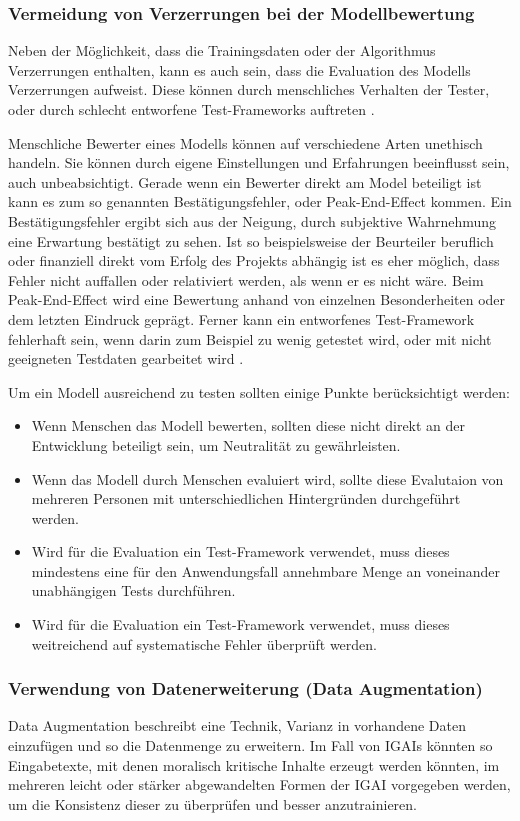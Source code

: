 \documentclass[12pt]{article}
\begin{document}
\subsubsection{Vermeidung von Verzerrungen bei der Modellbewertung}
Neben der Möglichkeit, dass die Trainingsdaten oder der Algorithmus Verzerrungen enthalten, kann es auch sein, dass die Evaluation des Modells Verzerrungen aufweist.
Diese können durch menschliches Verhalten der Tester, oder durch schlecht entworfene Test-Frameworks auftreten \cite[S. 54f.]{Srinivasan}.

Menschliche Bewerter eines Modells können auf verschiedene Arten unethisch handeln. Sie können durch eigene Einstellungen und Erfahrungen beeinflusst sein, auch unbeabsichtigt.
Gerade wenn ein Bewerter direkt am Model beteiligt ist kann es zum so genannten Bestätigungsfehler, oder \glqq Peak-End-Effect\grqq{} kommen. Ein Bestätigungsfehler ergibt sich aus der Neigung, durch subjektive Wahrnehmung eine Erwartung bestätigt zu sehen. Ist so beispielsweise der Beurteiler beruflich oder finanziell direkt vom Erfolg des Projekts abhängig ist es eher möglich, dass Fehler nicht auffallen oder relativiert werden, als wenn er es nicht wäre.
Beim \glqq Peak-End-Effect\grqq{} wird eine Bewertung anhand von einzelnen Besonderheiten oder dem letzten Eindruck geprägt.
Ferner kann ein entworfenes Test-Framework fehlerhaft sein, wenn darin zum Beispiel zu wenig getestet wird, oder mit nicht geeigneten Testdaten gearbeitet wird \cite[S. 54f.]{Srinivasan}.

Um ein Modell ausreichend zu testen sollten einige Punkte berücksichtigt werden:
\begin{itemize}
    \item Wenn Menschen das Modell bewerten, sollten diese nicht direkt an der Entwicklung beteiligt sein, um Neutralität zu gewährleisten.
    \item Wenn das Modell durch Menschen evaluiert wird, sollte diese Evalutaion von mehreren Personen mit unterschiedlichen Hintergründen durchgeführt werden.
    \item Wird für die Evaluation ein Test-Framework verwendet, muss dieses mindestens eine für den Anwendungsfall annehmbare Menge an voneinander unabhängigen Tests durchführen.
    \item Wird für die Evaluation ein Test-Framework verwendet, muss dieses weitreichend auf systematische Fehler überprüft werden.
\end{itemize}


\subsubsection{Verwendung von Datenerweiterung (Data Augmentation)}
Data Augmentation beschreibt eine Technik, Varianz in vorhandene Daten einzufügen und so die Datenmenge zu erweitern.
Im Fall von IGAIs könnten so Eingabetexte, mit denen moralisch kritische Inhalte erzeugt werden könnten, im mehreren leicht oder stärker abgewandelten Formen der IGAI vorgegeben werden, um die Konsistenz dieser zu überprüfen und besser anzutrainieren.  
\end{document}
